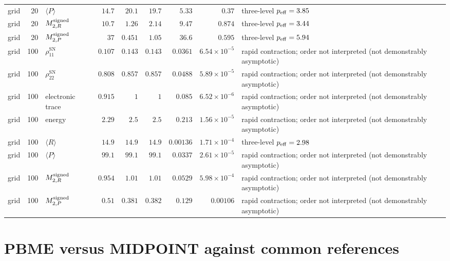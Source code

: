 \begin{landscape}
\begin{longtable}{l r l r r r r r L{0.18\textwidth}}
grid & 20 & $\langle P\rangle$ & $14.7$ & $20.1$ & $19.7$ & $5.33$ & $0.37$ & three-level $p_{\rm eff}=3.85$ \\
grid & 20 & $M^{\rm signed}_{2,R}$ & $10.7$ & $1.26$ & $2.14$ & $9.47$ & $0.874$ & three-level $p_{\rm eff}=3.44$ \\
grid & 20 & $M^{\rm signed}_{2,P}$ & $37$ & $0.451$ & $1.05$ & $36.6$ & $0.595$ & three-level $p_{\rm eff}=5.94$ \\
grid & 100 & $\rho_{11}^{\mathrm{SN}}$ & $0.107$ & $0.143$ & $0.143$ & $0.0361$ & $6.54\times10^{-5}$ & rapid contraction; order not interpreted (not demonstrably asymptotic) \\
grid & 100 & $\rho_{22}^{\mathrm{SN}}$ & $0.808$ & $0.857$ & $0.857$ & $0.0488$ & $5.89\times10^{-5}$ & rapid contraction; order not interpreted (not demonstrably asymptotic) \\
grid & 100 & electronic trace & $0.915$ & $1$ & $1$ & $0.085$ & $6.52\times10^{-6}$ & rapid contraction; order not interpreted (not demonstrably asymptotic) \\
grid & 100 & energy & $2.29$ & $2.5$ & $2.5$ & $0.213$ & $1.56\times10^{-5}$ & rapid contraction; order not interpreted (not demonstrably asymptotic) \\
grid & 100 & $\langle R\rangle$ & $14.9$ & $14.9$ & $14.9$ & $0.00136$ & $1.71\times10^{-4}$ & three-level $p_{\rm eff}=2.98$ \\
grid & 100 & $\langle P\rangle$ & $99.1$ & $99.1$ & $99.1$ & $0.0337$ & $2.61\times10^{-5}$ & rapid contraction; order not interpreted (not demonstrably asymptotic) \\
grid & 100 & $M^{\rm signed}_{2,R}$ & $0.954$ & $1.01$ & $1.01$ & $0.0529$ & $5.98\times10^{-4}$ & rapid contraction; order not interpreted (not demonstrably asymptotic) \\
grid & 100 & $M^{\rm signed}_{2,P}$ & $0.51$ & $0.381$ & $0.382$ & $0.129$ & $0.00106$ & rapid contraction; order not interpreted (not demonstrably asymptotic) \\
\end{longtable}
\endgroup
\end{landscape}

\section{PBME versus MIDPOINT against common references}
\label{sec:results-physical-comparison}

